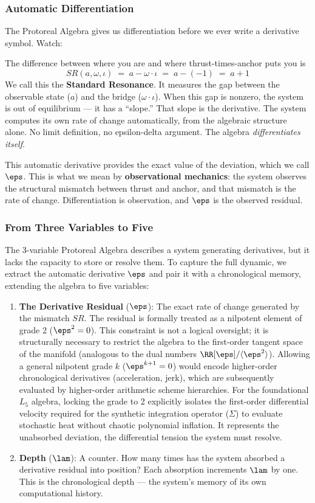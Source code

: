 \subsubsection*{Automatic Differentiation}

The Protoreal Algebra gives us differentiation before we ever write a derivative symbol. Watch:

The difference between where you are and where thrust-times-anchor puts you is
$$SR(a, \omega, \iota) \;=\; a - \omega \cdot \iota \;=\; a - (-1) \;=\; a + 1$$
We call this the \textbf{Standard Resonance}. It measures the gap between the observable state ($a$) and the bridge ($\omega \cdot \iota$). When this gap is nonzero, the system is out of equilibrium --- it has a ``slope.'' That slope is the derivative. The system computes its own rate of change automatically, from the algebraic structure alone. No limit definition, no epsilon-delta argument. The algebra \emph{differentiates itself}.

This automatic derivative provides the exact value of the deviation, which we call $\eps$. This is what we mean by \textbf{observational mechanics}: the system observes the structural mismatch between thrust and anchor, and that mismatch is the rate of change. Differentiation is observation, and $\eps$ is the observed residual.

\subsubsection*{From Three Variables to Five}

The 3-variable Protoreal Algebra describes a system generating derivatives, but it lacks the capacity to store or resolve them. To capture the full dynamic, we extract the automatic derivative $\eps$ and pair it with a chronological memory, extending the algebra to five variables:

\begin{enumerate}
\item \textbf{The Derivative Residual} ($\eps$): The exact rate of change generated by the mismatch $SR$. The residual is formally treated as a nilpotent element of grade 2 ($\eps^2 = 0$). This constraint is not a logical oversight; it is structurally necessary to restrict the algebra to the first-order tangent space of the manifold (analogous to the dual numbers $\RR[\eps]/\langle\eps^2\rangle$). Allowing a general nilpotent grade $k$ ($\eps^{k+1} = 0$) would encode higher-order chronological derivatives (acceleration, jerk), which are subsequently evaluated by higher-order arithmetic scheme hierarchies. For the foundational $L_5$ algebra, locking the grade to 2 explicitly isolates the first-order differential velocity required for the synthetic integration operator ($\Sigma$) to evaluate stochastic heat without chaotic polynomial inflation. It represents the unabsorbed deviation, the differential tension the system must resolve. 
\item \textbf{Depth} ($\lam$): A counter. How many times has the system absorbed a derivative residual into position? Each absorption increments $\lam$ by one. This is the chronological depth --- the system's memory of its own computational history.
\end{enumerate}

